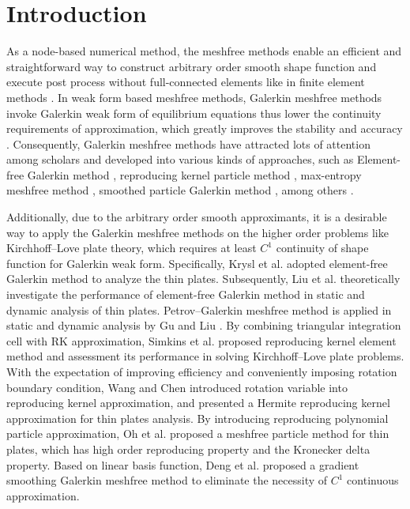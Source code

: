 \section{Introduction}

As a node-based numerical method, the meshfree methods enable an efficient and straightforward way to construct arbitrary order smooth shape function \cite{ref1,ref2,ref3,ref4,ref5,ref6,ref7} and execute post process without full-connected elements like in finite element methods \cite{ref8}.
In weak form based meshfree methods, Galerkin meshfree methods invoke Galerkin weak form of equilibrium equations thus lower the continuity requirements of approximation, which greatly improves the stability and accuracy \cite{ref1,ref5}.
Consequently, Galerkin meshfree methods have attracted lots of attention among scholars and developed into various kinds of approaches, such as Element-free Galerkin method \cite{ref9,ref10}, reproducing kernel particle method \cite{ref11}, max-entropy meshfree method \cite{ref12}, smoothed particle Galerkin method \cite{ref13}, among others \cite{ref14,ref20}.

Additionally, due to the arbitrary order smooth approximants, it is a desirable way to apply the Galerkin meshfree methods on the higher order problems like Kirchhoff--Love plate theory, which requires at least $C^1$ continuity of shape function for Galerkin weak form.
Specifically, Krysl et al. \cite{ref21} adopted element-free Galerkin method to analyze the thin plates.
Subsequently, Liu et al. \cite{ref22,ref23} theoretically investigate the performance of element-free Galerkin method in static and dynamic analysis of thin plates.
Petrov--Galerkin meshfree method is applied in static and dynamic analysis by Gu and Liu \cite{ref24}.
By combining triangular integration cell with RK approximation, Simkins et al. \cite{ref25} proposed reproducing kernel element method and assessment its performance in solving Kirchhoff--Love plate problems.
With the expectation of improving efficiency and conveniently imposing rotation boundary condition, Wang and Chen \cite{ref26} introduced rotation variable into reproducing kernel approximation, and presented a Hermite reproducing kernel approximation for thin plates analysis.
By introducing reproducing polynomial particle approximation, Oh et al. \cite{ref27} proposed a meshfree particle method for thin plates, which has high order reproducing property and the Kronecker delta property.
Based on linear basis function, Deng et al. \cite{ref28} proposed a gradient smoothing Galerkin meshfree method to eliminate the necessity of $C^1$ continuous approximation.

